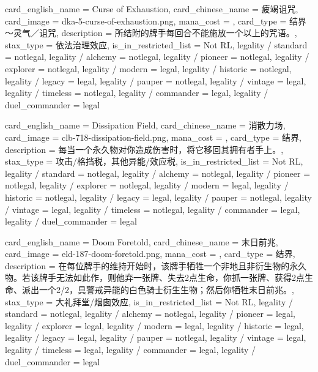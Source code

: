 \documentclass[lang = cn, color = black, 10pt]{AllThatStax}
\begin{document}
\card
{
	card_english_name = {Curse of Exhaustion},
	card_chinese_name = {疲竭诅咒},
	card_image = dka-5-curse-of-exhaustion.png,
	mana_cost = ,
	card_type = 结界～灵气／诅咒,
	description = {所结附的牌手每回合不能施放一个以上的咒语。},
	stax_type = 依法治理效应,
	is_in_restricted_list = Not RL,
	legality / standard = notlegal,
	legality / alchemy = notlegal,
	legality / pioneer = notlegal,
	legality / explorer = notlegal,
	legality / modern = legal,
	legality / historic = notlegal,
	legality / legacy = legal,
	legality / pauper = notlegal,
	legality / vintage = legal,
	legality / timeless = notlegal,
	legality / commander = legal,
	legality / duel_commander = legal
}

\card
{
	card_english_name = {Dissipation Field},
	card_chinese_name = {消散力场},
	card_image = clb-718-dissipation-field.png,
	mana_cost = ,
	card_type = 结界,
	description = {每当一个永久物对你造成伤害时，将它移回其拥有者手上。},
	stax_type = 攻击/格挡税，其他异能/效应税,
	is_in_restricted_list = Not RL,
	legality / standard = notlegal,
	legality / alchemy = notlegal,
	legality / pioneer = notlegal,
	legality / explorer = notlegal,
	legality / modern = legal,
	legality / historic = notlegal,
	legality / legacy = legal,
	legality / pauper = notlegal,
	legality / vintage = legal,
	legality / timeless = notlegal,
	legality / commander = legal,
	legality / duel_commander = legal
}

\card
{
	card_english_name = {Doom Foretold},
	card_chinese_name = {末日前兆},
	card_image = eld-187-doom-foretold.png,
	mana_cost = ,
	card_type = 结界,
	description = {在每位牌手的维持开始时，该牌手牺牲一个非地且非衍生物的永久物。若该牌手无法如此作，则他弃一张牌、失去2点生命，你抓一张牌、获得2点生命、派出一个2/2，具警戒异能的白色骑士衍生生物；然后你牺牲末日前兆。},
	stax_type = 大礼拜堂/烟囱效应,
	is_in_restricted_list = Not RL,
	legality / standard = notlegal,
	legality / alchemy = notlegal,
	legality / pioneer = legal,
	legality / explorer = legal,
	legality / modern = legal,
	legality / historic = legal,
	legality / legacy = legal,
	legality / pauper = notlegal,
	legality / vintage = legal,
	legality / timeless = legal,
	legality / commander = legal,
	legality / duel_commander = legal
}
\end{document}
